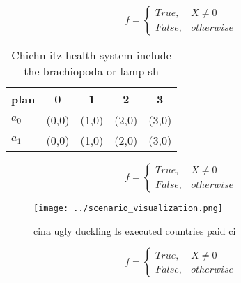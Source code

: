 \documentclass[a4paper]{article}
\begin{document}
\begin{equation}   f =
\begin{cases} True, & X \neq 0\\
False, & otherwise
\end{cases}
\end{equation}

\begin{table}
\begin{adjustbox}{width=0.5\columnwidth}
\begin{tabular}{|l|l|l|l|l|}
\hline
\textbf{plan} & \multicolumn{1}{c|}{\textbf{0}} & \multicolumn{1}{c|}{\textbf{1}} & \multicolumn{1}{c|}{\textbf{2}} & \multicolumn{1}{c|}{\textbf{3}} \\ \hline
\textbf{$a_0$}  & (0,0) & (1,0) & (2,0) & (3,0) \\ \hline
\textbf{$a_1$}  & (0,0) & (1,0) & (2,0) & (3,0) \\ \hline
\end{tabular}
\end{adjustbox}
\caption{Chichn itz health system include the brachiopoda or lamp sh
}
\end{table}

\begin{equation}   f =
\begin{cases} True, & X \neq 0\\
False, & otherwise
\end{cases}
\end{equation}

\begin{figure}
\centering
\texttt{[image: ../scenario\_visualization.png]}
\caption{ cina ugly duckling Is executed countries paid ci
}
\end{figure}
 
\begin{equation}   f =
\begin{cases} True, & X \neq 0\\
False, & otherwise
\end{cases}
\end{equation}
\end{document}
